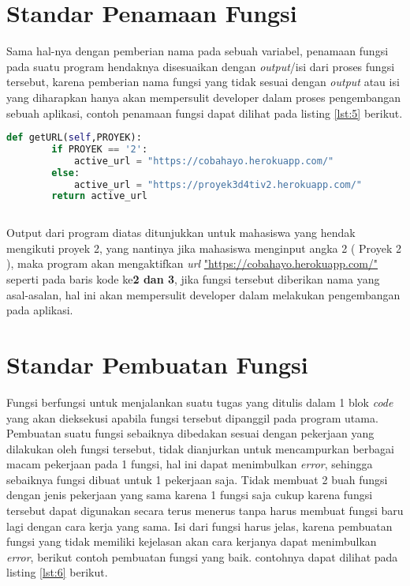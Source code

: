 \section{Standar Penamaan Fungsi}
\par 
Sama hal-nya dengan pemberian nama pada sebuah variabel, penamaan fungsi pada suatu program hendaknya disesuaikan dengan \textit{output}/isi dari proses fungsi tersebut, karena pemberian nama fungsi yang tidak sesuai dengan \textit{output} atau isi yang diharapkan hanya akan mempersulit developer dalam proses pengembangan sebuah aplikasi, contoh penamaan fungsi dapat dilihat pada listing \ref{lst:5} berikut.

\begin{lstlisting}[language=Python, caption=Contoh standar penamaan fungsi,label={lst:5}]
	def getURL(self,PROYEK):
		if PROYEK == '2':
			active_url = "https://cobahayo.herokuapp.com/"
		else:
			active_url = "https://proyek3d4tiv2.herokuapp.com/"
		return active_url
		
\end{lstlisting}

\par 
Output dari program diatas ditunjukkan untuk mahasiswa yang hendak mengikuti proyek 2, yang nantinya jika mahasiswa menginput angka 2 ( Proyek 2 ), maka program akan mengaktifkan \textit{url} \url{"https://cobahayo.herokuapp.com/"} seperti pada baris kode ke\textbf{2 dan 3}, jika fungsi tersebut diberikan nama yang asal-asalan, hal ini akan mempersulit developer dalam melakukan pengembangan pada aplikasi.

\section{Standar Pembuatan Fungsi}
\par 
Fungsi berfungsi untuk menjalankan suatu tugas yang ditulis dalam 1 blok \textit{code} yang akan dieksekusi apabila fungsi tersebut dipanggil pada program utama. Pembuatan suatu fungsi sebaiknya dibedakan sesuai dengan pekerjaan yang dilakukan oleh fungsi tersebut, tidak dianjurkan untuk mencampurkan berbagai macam pekerjaan pada 1 fungsi, hal ini dapat menimbulkan \textit{error}, sehingga sebaiknya fungsi dibuat untuk 1 pekerjaan saja. Tidak membuat 2 buah fungsi dengan jenis pekerjaan yang sama karena 1 fungsi saja cukup karena fungsi tersebut dapat digunakan secara terus menerus tanpa harus membuat fungsi baru lagi dengan cara kerja yang sama. Isi dari fungsi harus jelas, karena pembuatan fungsi yang tidak memiliki kejelasan akan cara kerjanya dapat menimbulkan \textit{error}, berikut contoh pembuatan fungsi yang baik. contohnya dapat dilihat pada listing \ref{lst:6} berikut.

